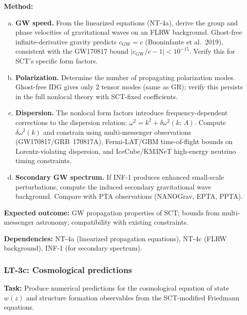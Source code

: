 \documentclass[12pt,a4paper]{article}
\newcommand{\task}[1]{\noindent\textbf{Task:} #1\par}
\newcommand{\method}[1]{\noindent\textbf{Method:} #1\par}
\newcommand{\outcome}[1]{\noindent\textbf{Expected outcome:} #1\par}
\newcommand{\deps}[1]{\noindent\textbf{Dependencies:} #1\par}
\begin{document}
\method{
\begin{enumerate}[(a)]
  \item \textbf{GW speed.} From the linearized equations (NT-4a), derive the
    group and phase velocities of gravitational waves on an FLRW background.
    Ghost-free infinite-derivative gravity predicts $c_{\text{GW}} = c$
    (Buoninfante et al.\ 2019), consistent with the GW170817 bound
    $|c_{\text{GW}}/c - 1| < 10^{-15}$. Verify this for SCT's specific
    form factors.
  \item \textbf{Polarization.} Determine the number of propagating polarization
    modes. Ghost-free IDG gives only 2 tensor modes (same as GR); verify this
    persists in the full nonlocal theory with SCT-fixed coefficients.
  \item \textbf{Dispersion.} The nonlocal form factors introduce
    frequency-dependent corrections to the dispersion relation:
    $\omega^2 = k^2 + \delta\omega^2(k;\, \Lambda)$.
    Compute $\delta\omega^2(k)$ and constrain using multi-messenger observations
    (GW170817/GRB~170817A), Fermi-LAT/GBM time-of-flight bounds on
    Lorentz-violating dispersion, and IceCube/KM3NeT high-energy neutrino
    timing constraints.
  \item \textbf{Secondary GW spectrum.} If INF-1 produces enhanced small-scale
    perturbations, compute the induced secondary gravitational wave background.
    Compare with PTA observations (NANOGrav, EPTA, PPTA).
\end{enumerate}
}

\outcome{GW propagation properties of SCT; bounds from multi-messenger
astronomy; compatibility with existing constraints.}

\deps{NT-4a (linearized propagation equations), NT-4c (FLRW background),
INF-1 (for secondary spectrum).}

\subsubsection{LT-3c: Cosmological predictions}
\label{task:LT3c}

\task{Produce numerical predictions for the cosmological equation of state
$w(z)$ and structure formation observables from the SCT-modified Friedmann
equations.}
\end{document}
